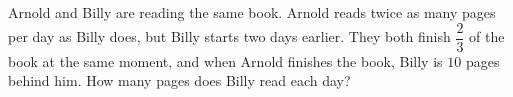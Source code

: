 Arnold and Billy are reading the same book. Arnold reads twice as many pages per day as Billy does, but Billy starts two days earlier. They both finish $\dfrac23$ of the book at the same moment, and when Arnold finishes the book, Billy is $10$ pages behind him. How many pages does Billy read each day?
